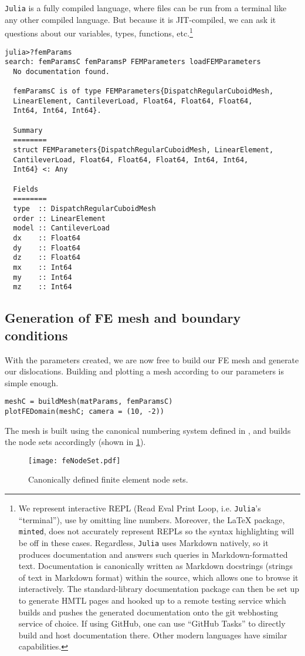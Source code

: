 \texttt{Julia} is a fully compiled language, where files can be run from a terminal like any other compiled language. But because it is JIT-compiled, we can ask it questions about our variables, types, functions, etc.\footnote{We represent interactive REPL (Read Eval Print Loop, i.e. \texttt{Julia}'s ``terminal''), use by omitting line numbers. Moreover, the \LaTeX{} package, \texttt{minted}, does not accurately represent REPLs so the syntax highlighting will be off in these cases. Regardless, \texttt{Julia} uses Markdown natively, so it produces documentation and answers such queries in Markdown-formatted text. Documentation is canonically written as Markdown docstrings (strings of text in Markdown format) within the source, which allows one to browse it interactively. The standard-library documentation package can then be set up to generate HMTL pages and hooked up to a remote testing service which builds and pushes the generated documentation onto the git webhosting service of choice. If using GitHub, one can use ``GitHub Tasks'' to directly build and host documentation there. Other modern languages have similar capabilities.}
\begin{verbatim}
julia>?femParams
search: femParamsC femParamsP FEMParameters loadFEMParameters
  No documentation found.

  femParamsC is of type FEMParameters{DispatchRegularCuboidMesh, 
  LinearElement, CantileverLoad, Float64, Float64, Float64, 
  Int64, Int64, Int64}.

  Summary  
  ========
  struct FEMParameters{DispatchRegularCuboidMesh, LinearElement, 
  CantileverLoad, Float64, Float64, Float64, Int64, Int64, 
  Int64} <: Any

  Fields
  ========
  type  :: DispatchRegularCuboidMesh
  order :: LinearElement
  model :: CantileverLoad
  dx    :: Float64
  dy    :: Float64
  dz    :: Float64
  mx    :: Int64
  my    :: Int64
  mz    :: Int64
\end{verbatim}

\subsection{Generation of FE mesh and boundary conditions}

With the parameters created, we are now free to build our FE mesh and generate our dislocations. Building and plotting a mesh according to our parameters is simple enough.
\begin{verbatim}
meshC = buildMesh(matParams, femParamsC)
plotFEDomain(meshC; camera = (10, -2))
\end{verbatim}
The mesh is built using the canonical numbering system defined in \cite{femcanonical}, and builds the node sets accordingly (shown in \cref{f:feNodeSet}).
\begin{figure}
    \centering
    \texttt{[image: feNodeSet.pdf]}
    \caption[Canonically defined finite element node sets.]{Canonically defined finite element node sets.}
    \label{f:feNodeSet}
\end{figure}

